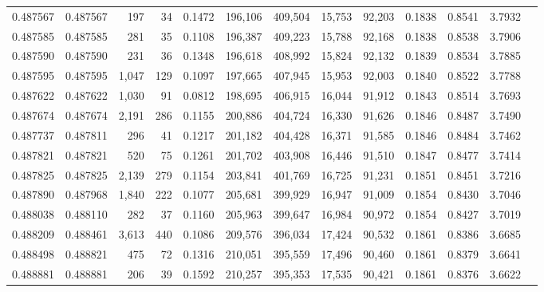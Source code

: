 \begin{tabular}{rrrrrrrrrrrrr}
0.487567 & 0.487567 &   197 &    34 &                                     0.1472 & 196,106 & 409,504 &  15,753 &  92,203 & 0.1838 & 0.8541 & 3.7932 \\
0.487585 & 0.487585 &   281 &    35 &                                     0.1108 & 196,387 & 409,223 &  15,788 &  92,168 & 0.1838 & 0.8538 & 3.7906 \\
0.487590 & 0.487590 &   231 &    36 &                                     0.1348 & 196,618 & 408,992 &  15,824 &  92,132 & 0.1839 & 0.8534 & 3.7885 \\
0.487595 & 0.487595 & 1,047 &   129 &                                     0.1097 & 197,665 & 407,945 &  15,953 &  92,003 & 0.1840 & 0.8522 & 3.7788 \\
0.487622 & 0.487622 & 1,030 &    91 &                                     0.0812 & 198,695 & 406,915 &  16,044 &  91,912 & 0.1843 & 0.8514 & 3.7693 \\
0.487674 & 0.487674 & 2,191 &   286 &                                     0.1155 & 200,886 & 404,724 &  16,330 &  91,626 & 0.1846 & 0.8487 & 3.7490 \\
0.487737 & 0.487811 &   296 &    41 &                                     0.1217 & 201,182 & 404,428 &  16,371 &  91,585 & 0.1846 & 0.8484 & 3.7462 \\
0.487821 & 0.487821 &   520 &    75 &                                     0.1261 & 201,702 & 403,908 &  16,446 &  91,510 & 0.1847 & 0.8477 & 3.7414 \\
0.487825 & 0.487825 & 2,139 &   279 &                                     0.1154 & 203,841 & 401,769 &  16,725 &  91,231 & 0.1851 & 0.8451 & 3.7216 \\
0.487890 & 0.487968 & 1,840 &   222 &                                     0.1077 & 205,681 & 399,929 &  16,947 &  91,009 & 0.1854 & 0.8430 & 3.7046 \\
0.488038 & 0.488110 &   282 &    37 &                                     0.1160 & 205,963 & 399,647 &  16,984 &  90,972 & 0.1854 & 0.8427 & 3.7019 \\
0.488209 & 0.488461 & 3,613 &   440 &                                     0.1086 & 209,576 & 396,034 &  17,424 &  90,532 & 0.1861 & 0.8386 & 3.6685 \\
0.488498 & 0.488821 &   475 &    72 &                                     0.1316 & 210,051 & 395,559 &  17,496 &  90,460 & 0.1861 & 0.8379 & 3.6641 \\
0.488881 & 0.488881 &   206 &    39 &                                     0.1592 & 210,257 & 395,353 &  17,535 &  90,421 & 0.1861 & 0.8376 & 3.6622 \\

\end{tabular}
